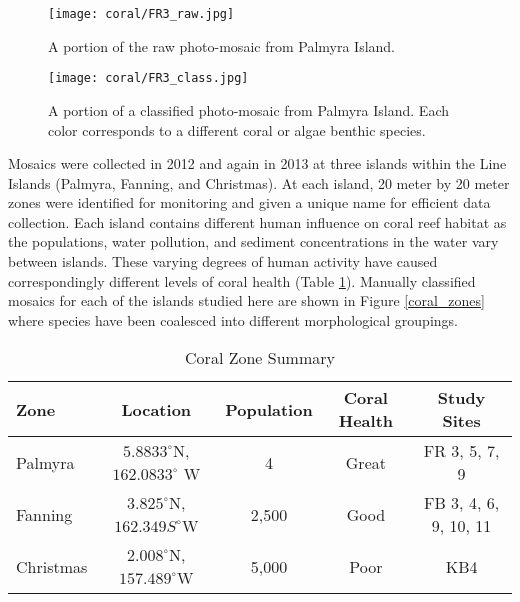 \begin{figure}[htbp] %
   \centering
   \texttt{[image: coral/FR3\_raw.jpg]} 
   \caption{A portion of the raw photo-mosaic from Palmyra Island.}
   \label{coral_mosaic}
\end{figure}

\begin{figure}[htbp] %
   \centering
   \texttt{[image: coral/FR3\_class.jpg]} 
   \caption{A portion of a classified photo-mosaic from Palmyra Island. Each color corresponds to a different coral or algae benthic species.}
   \label{classified_mosaic}
\end{figure}


Mosaics were collected in 2012 and again in 2013 at three islands within the Line Islands (Palmyra, Fanning, and Christmas). At each island, 20 meter by 20 meter zones were identified for monitoring and given a unique name for efficient data collection. Each island contains different human influence on coral reef habitat as the populations, water pollution, and sediment concentrations in the water vary between islands.  These varying degrees of human activity have caused correspondingly different levels of coral health \cite{line_islands_gradient} (Table \ref{coral_data}).  Manually classified mosaics for each of the islands studied here are shown in Figure \ref{coral_zones} where species have been coalesced into different morphological groupings.



\begin{table}[htbp]
\caption{Coral Zone Summary}
\begin{center}
\begin{tabular}{| l || c | c | c | c|}
  \hline       
  Zone & Location & Population & Coral Health & Study Sites\\
  \hline
  Palmyra & $5.8833^\circ$N, $162.0833^\circ$ W & 4 & Great & FR 3, 5, 7, 9 \\
  Fanning & $3.825^\circ$N, $162.349S^\circ$W & 2,500 & Good & FB 3, 4, 6, 9, 10, 11  \\
  Christmas &  $2.008^\circ$N, $157.489^\circ$W & 5,000 & Poor & KB4 \\
  \hline  
\end{tabular}
\end{center}
\label{coral_data}
\end{table}



